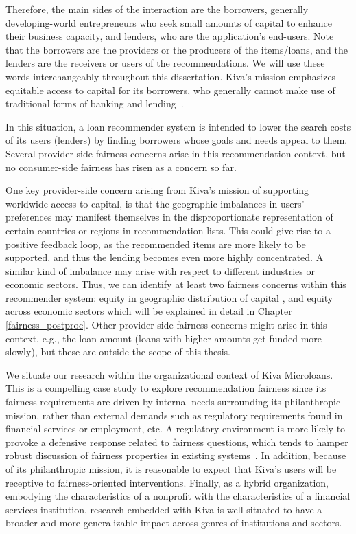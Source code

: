     Therefore, the main sides of the interaction are the borrowers, generally developing-world entrepreneurs who seek small amounts of capital to enhance their business capacity, and lenders, who are the application's end-users. Note that the borrowers are the providers or the producers of the items/loans, and the lenders are the receivers or users of the recommendations. We will use these words interchangeably throughout this dissertation. Kiva's mission emphasizes equitable access to capital for its borrowers, who generally cannot make use of traditional forms of banking and lending~\cite{Choo_understanding_kiva}.
    
    
    In this situation, a loan recommender system is intended to lower the search costs of its users (lenders) by finding borrowers whose goals and needs appeal to them. Several provider-side fairness concerns arise in this recommendation context, but no consumer-side fairness has risen as a concern so far. 
    
    One key provider-side concern arising from Kiva's mission of supporting worldwide access to capital, is that the geographic imbalances in users' preferences may manifest themselves in the disproportionate representation of certain countries or regions in recommendation lists. This could give rise to a positive feedback loop, as the recommended items are more likely to be supported, and thus the lending becomes even more highly concentrated. A similar kind of imbalance may arise with respect to different industries or economic sectors. Thus, we can identify at least two fairness concerns within this recommender system: equity in geographic distribution of capital \cite{liu2019personalized}, and equity across economic sectors \cite{sonboli2020opportunistic} which will be explained in detail in Chapter \ref{fairness_postproc}. Other provider-side fairness concerns might arise in this context, e.g., the loan amount (loans with higher amounts get funded more slowly), but these are outside the scope of this thesis.
    
    We situate our research within the organizational context of Kiva Microloans. This is a compelling case study to explore recommendation fairness since its fairness requirements are driven by internal needs surrounding its philanthropic mission, rather than external demands such as regulatory requirements found in financial services or employment, etc. A regulatory environment is more likely to provoke a defensive response related to fairness questions, which tends to hamper robust discussion of fairness properties in existing systems~\cite{chen2018fair,holstein2019improving}. In addition, because of its philanthropic mission, it is reasonable to expect that Kiva's users will be receptive to fairness-oriented interventions. Finally, as a hybrid organization, embodying the characteristics of a nonprofit with the characteristics of a financial services institution, research embedded with Kiva is well-situated to have a broader and more generalizable impact across genres of institutions and sectors.


